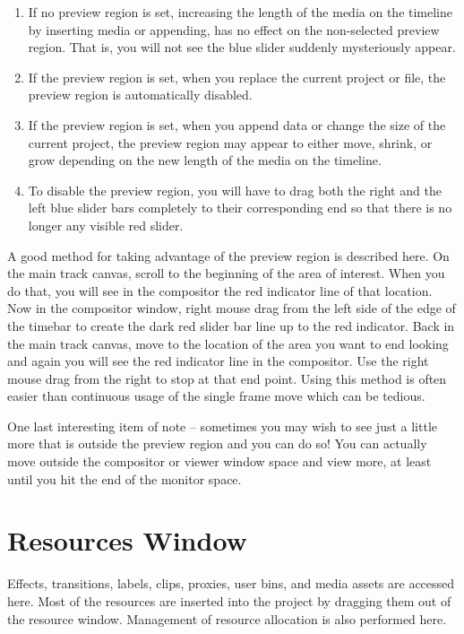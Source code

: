 \begin{enumerate}
    \item  If no preview region is set, increasing the length of the media on the timeline by inserting media or
        appending, has no effect on the non-selected preview region.  That is, you will not see the blue slider
        suddenly mysteriously appear.
    \item  If the preview region is set, when you replace the current project or file,  the preview region is
        automatically disabled.
    \item  If the preview region is set, when you append data or change the size of the current project, the
        preview region may appear to either move, shrink, or grow depending on the new length of the
        media on the timeline.  
    \item  To disable the preview region, you will have to drag both the right and the left blue slider bars
        completely to their corresponding end so that there is no longer any visible red slider.
\end{enumerate}

A good method for taking advantage of the preview region is described here.  
On the main track canvas, scroll to the beginning of the area of interest.  
When you do that, you will see in the compositor the red indicator line of that location.  
Now in the compositor window, right mouse drag from the left side of the edge of the timebar to create the dark red slider bar line up to the red indicator.  
Back in the main track canvas, move to the location of the area you want to end looking and again you will see the red indicator line in the compositor.  
Use the right mouse drag from the right to stop at that end point.  Using this method is often easier than continuous usage of the single frame move which can be tedious.

One last interesting item of note -- sometimes you may wish to see just a little more that is outside the preview region and you can do so!  You can actually move outside the compositor or viewer window space and view more, at least until you hit the end of the monitor space.

\section{Resources Window}%
\label{sec:resources_window}

Effects, transitions, labels, clips, proxies, user bins, and media assets are accessed here. 
Most of the resources are inserted into the project by dragging them out of the resource window. 
Management of resource allocation is also performed here.

